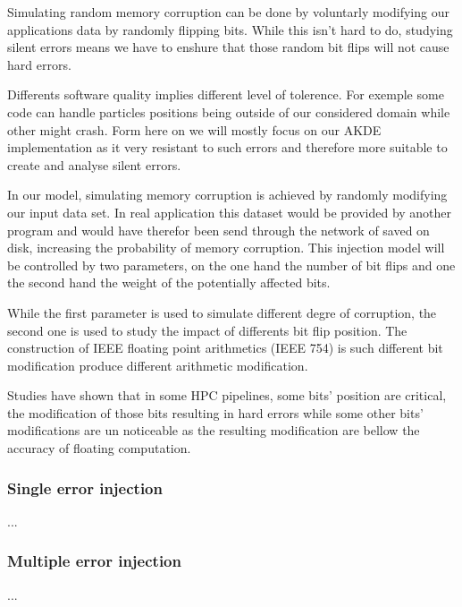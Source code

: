 \documentclass[10pt,a4paper,twoside,twocolumn]{article}
\newcommand*{\rootPath}{../}
\begin{document}
Simulating random memory corruption can be done by voluntarly modifying our
applications data by randomly flipping bits. While this isn't hard to do,
studying silent errors means we have to enshure that those random bit flips will
not cause hard errors.

Differents software quality implies different level of tolerence. For exemple
some code can handle particles positions being outside of our considered domain
while other might crash. Form here on we will
mostly focus on our AKDE implementation as it very resistant to such errors and
therefore more suitable to create and analyse silent errors.

In our model, simulating memory corruption is achieved by randomly modifying our
input data set. In real application this dataset would be provided by another
program and would have therefor been send through the network of saved on disk,
increasing the probability of memory corruption. This injection model will be
controlled by two parameters, on the one hand the number of bit flips and one
the second hand the weight of the potentially affected bits.

While the first parameter is used to simulate different degre of corruption, the
second one is used to study the impact of differents bit flip position. The
construction of IEEE floating point arithmetics\cite{Kahan1996} (IEEE 754) is such
different bit modification produce different arithmetic modification.

Studies have shown that in some HPC pipelines, some bits' position are critical,
the modification of those bits resulting in hard errors while some other bits' 
modifications are un noticeable as the resulting modification are bellow the
accuracy of floating computation.

\subsubsection{Single error injection}

... %

\subsubsection{Multiple error injection}

... %

\ifstandalone
	
	
\fi
\end{document}
